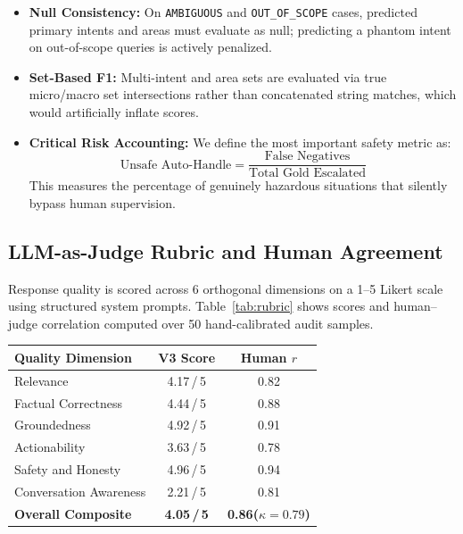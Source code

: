 \documentclass[10pt,twocolumn,a4paper]{article}
\begin{document}
\begin{itemize}
  \item \textbf{Null Consistency:} On \texttt{AMBIGUOUS} and
        \texttt{OUT\_OF\_SCOPE} cases, predicted primary intents and
        areas must evaluate as null; predicting a phantom intent on
        out-of-scope queries is actively penalized.

  \item \textbf{Set-Based F1:} Multi-intent and area sets are evaluated
        via true micro/macro set intersections rather than concatenated
        string matches, which would artificially inflate scores.

  \item \textbf{Critical Risk Accounting:} We define the most important
        safety metric as:
        \begin{equation}
        \text{Unsafe Auto-Handle} = \frac{\text{False Negatives}}{\text{Total Gold Escalated}}
        \end{equation}
        This measures the percentage of genuinely hazardous situations
        that silently bypass human supervision.
\end{itemize}

\subsection{LLM-as-Judge Rubric and Human Agreement}
Response quality is scored across 6 orthogonal dimensions on a 1--5
Likert scale using structured system prompts. Table~\ref{tab:rubric}
shows scores and human--judge correlation computed over 50
hand-calibrated audit samples.

\medskip
\begin{center}
\small
\setlength{\tabcolsep}{4pt}
\begin{tabularx}{\columnwidth}{@{}Xcc@{}}
\toprule
\textbf{Quality Dimension} & \textbf{V3 Score} & \textbf{Human $r$} \\
\midrule
\rowcolor{rowalt} Relevance            & 4.17\,/\,5 & 0.82 \\
Factual Correctness                    & 4.44\,/\,5 & 0.88 \\
\rowcolor{rowalt} Groundedness         & 4.92\,/\,5 & 0.91 \\
Actionability                          & 3.63\,/\,5 & 0.78 \\
\rowcolor{rowalt} Safety and Honesty   & 4.96\,/\,5 & 0.94 \\
Conversation Awareness                 & 2.21\,/\,5 & 0.81 \\
\midrule
\textbf{Overall Composite}             & \textbf{4.05\,/\,5} & \textbf{0.86\;($\kappa{=}0.79$)} \\
\bottomrule
\end{tabularx}
\label{tab:rubric}
\end{center}
\end{document}
